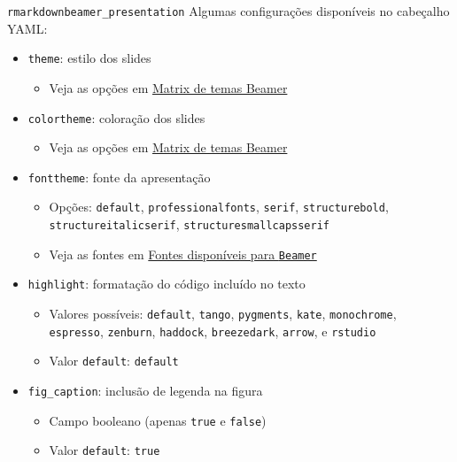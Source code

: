 \documentclass[
  10pt,
  ignorenonframetext,
]{beamer}
\providecommand{\tightlist}{%
  \setlength{\itemsep}{0pt}\setlength{\parskip}{0pt}}\usepackage{longtable,booktabs,array}
\begin{document}
\begin{frame}[fragile]{\texttt{rmarkdown}\newline \texttt{beamer\_presentation}}
\protect\hypertarget{rmarkdownbeamer_presentation-1}{}
Algumas configurações disponíveis no cabeçalho YAML:

\begin{itemize}
\tightlist
\item
  \texttt{theme}: estilo dos slides

  \begin{itemize}
  \tightlist
  \item
    Veja as opções em
    \href{https://hartwork.org/beamer-theme-matrix/}{Matrix de temas
    Beamer}
  \end{itemize}
\item
  \texttt{colortheme}: coloração dos slides

  \begin{itemize}
  \tightlist
  \item
    Veja as opções em
    \href{https://hartwork.org/beamer-theme-matrix/}{Matrix de temas
    Beamer}
  \end{itemize}
\item
  \texttt{fonttheme}: fonte da apresentação

  \begin{itemize}
  \tightlist
  \item
    Opções: \texttt{default}, \texttt{professionalfonts},
    \texttt{serif}, \texttt{structurebold},
    \texttt{structureitalicserif}, \texttt{structuresmallcapsserif}
  \item
    Veja as fontes em
    \href{https://deic.uab.cat/~iblanes/beamer_gallery/index_by_font.html}{Fontes
    disponíveis para \texttt{Beamer}}
  \end{itemize}
\item
  \texttt{highlight}: formatação do código incluído no texto

  \begin{itemize}
  \tightlist
  \item
    Valores possíveis: \texttt{default}, \texttt{tango},
    \texttt{pygments}, \texttt{kate}, \texttt{monochrome},
    \texttt{espresso}, \texttt{zenburn}, \texttt{haddock},
    \texttt{breezedark}, \texttt{arrow}, e \texttt{rstudio}
  \item
    Valor \texttt{default}: \texttt{default}
  \end{itemize}
\item
  \texttt{fig\_caption}: inclusão de legenda na figura

  \begin{itemize}
  \tightlist
  \item
    Campo booleano (apenas \texttt{true} e \texttt{false})
  \item
    Valor \texttt{default}: \texttt{true}
  \end{itemize}
\end{itemize}
\end{frame}
\end{document}
